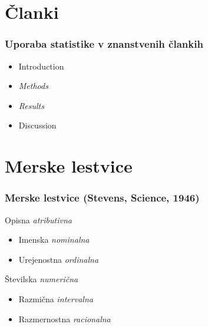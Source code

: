 \section{Članki}
\begin{frame}[fragile]
\frametitle{Uporaba statistike v znanstvenih člankih}
\begin{itemize}
  \item Introduction
  \item \emph{Methods}
  \item \emph{Results}
  \item Discussion
\end{itemize}
\end{frame}
%
\usepackage[utf8]{inputenc} %

\section[Merjenje]{Merske lestvice}

\begin{frame}[fragile]
\frametitle{Merske lestvice \hfill (Stevens, Science, 1946)}

\begin{block}{Opisna \hfill \emph{atributivna}}
  \begin{itemize}
    \item Imenska \hfill \emph{nominalna}
    \item Urejenostna \hfill \emph{ordinalna}
  \end{itemize}
\end{block}

\begin{block}{Številska \hfill \emph{numerična}}
  \begin{itemize}
    \item Razmična \hfill \emph{intervalna}
    \item Razmernostna \hfill \emph{racionalna}
  \end{itemize}
\end{block}
\end{frame}

